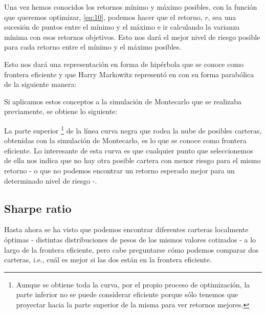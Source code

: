 Una vez hemos conocidos los retornos mínimo y máximo posibles, con la función que queremos optimizar, \ref{eq:10}, podemos hacer que el retorno, $r$, sea una sucesión de puntos entre el mínimo y el máximo e ir calculando la varianza mínima con esos retornos objetivos. Esto nos dará el mejor nivel de riesgo posible para cada retorno entre el mínimo y el máximo posibles. 

Esto nos dará una representación en forma de hipérbola que se conoce como frontera eficiente \citep{wiki:frontera_eficiente} y que Harry Markowitz representó en \citep{book:Portfolio_selection} con su forma parabólica de la siguiente manera:


Si aplicamos estos conceptos a la simulación de Montecarlo que se realizaba previamente, se obtiene lo siguiente:


La parte superior \footnote{Aunque se obtiene toda la curva, por el propio proceso de optimización, la parte inferior no se puede considerar eficiente porque sólo tenemos que proyectar hacia la parte superior de la misma para ver retornos mejores.} de la línea curva negra que rodea la nube de posibles carteras, obtenidas con la simulación de Montecarlo, es lo que se conoce como frontera eficiente. Lo interesante de esta curva es que cualquier punto que seleccionemos de ella nos indica que no hay otra posible cartera con menor riesgo para el mismo retorno - o que no podemos encontrar un retorno esperado mejor para un determinado nivel de riesgo -.


\subsection{Sharpe ratio}

Hasta ahora se ha visto que podemos encontrar diferentes carteras localmente óptimas - distintas distribuciones de pesos de los mismos valores cotizados - a lo largo de la frontera eficiente, pero cabe preguntarse cómo podemos comparar dos carteras, i.e., cuál es mejor si las dos están en la frontera eficiente.

